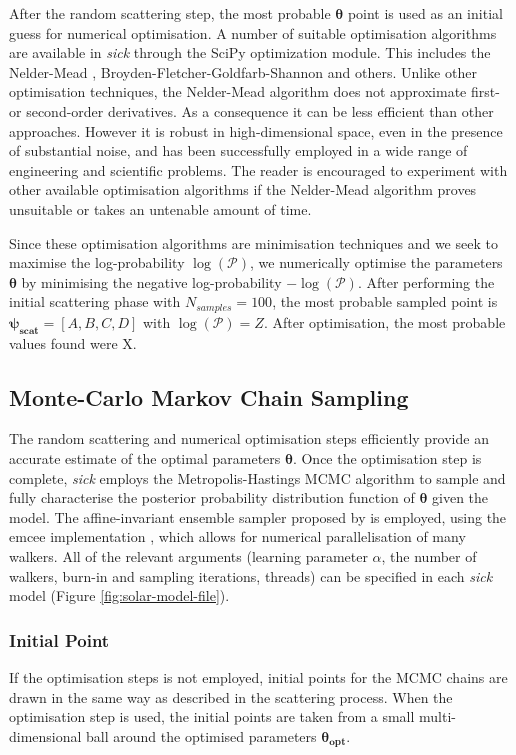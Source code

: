 \documentclass{aastex}
\newcommand{\sick}{\textit{sick}}
\begin{document}
After the random scattering step, the most probable $\bm{\theta}$ point is used as an initial guess for numerical optimisation. A number of suitable optimisation algorithms are available in \sick{} through the SciPy optimization \cite{scipy,scipy-optimize} module. This includes the Nelder-Mead \citet[default;][]{nelder-mead}, Broyden-Fletcher-Goldfarb-Shannon \cite{bfgs} and others. Unlike other optimisation techniques, the Nelder-Mead algorithm does not approximate first- or second-order derivatives. As a consequence it can be less efficient than other approaches. However it is robust in high-dimensional space, even in the presence of substantial noise, and has been successfully employed in a wide range of engineering and scientific problems. The reader is encouraged to experiment with other available optimisation algorithms if the Nelder-Mead algorithm proves unsuitable or takes an untenable amount of time.

Since these optimisation algorithms are minimisation techniques and we seek to maximise the log-probability $\log{\left(\mathcal{P}\right)}$, we numerically optimise the parameters $\bm{\theta}$ by minimising the negative log-probability $-\log{\left(\mathcal{P}\right)}$. After performing the initial scattering phase with $N_{samples} = 100$, the most probable sampled point is $\bm{\psi_{scat}} = [A,B,C,D]$ with $\log{\left(\mathcal{P}\right)} = Z$. After optimisation, the most probable values found were X.


\subsection{Monte-Carlo Markov Chain Sampling}
\label{sec:mcmc}

The random scattering and numerical optimisation steps efficiently provide an accurate estimate of the optimal parameters $\bm{\theta}$. Once the optimisation step is complete, \sick{} employs the Metropolis-Hastings MCMC algorithm to sample and fully characterise the posterior probability distribution function of $\bm{\theta}$ given the model. The affine-invariant ensemble sampler proposed by \citet{goodman;weave} is employed, using the emcee implementation \citep{emcee}, which allows for numerical parallelisation of many walkers. All of the relevant arguments (learning parameter $\alpha$, the number of walkers, burn-in and sampling iterations, threads) can be specified in each \sick{} model (Figure \ref{fig:solar-model-file}).

\subsubsection{Initial Point}
\label{sec:initial-point}
If the optimisation steps is not employed, initial points for the MCMC chains are drawn in the same way as described in the scattering process. When the optimisation step is used, the initial points are taken from a small multi-dimensional ball around the optimised parameters $\bm{\theta_{opt}}$.
\end{document}
